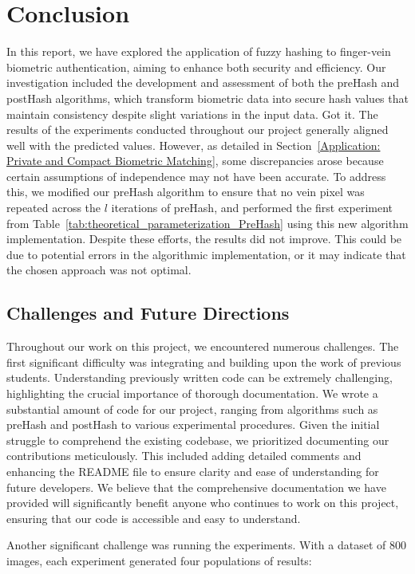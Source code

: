 \newpage

\section{Conclusion}
In this report, we have explored the application of fuzzy hashing to finger-vein biometric authentication, aiming to enhance both security and efficiency. Our investigation included the development and assessment of both the preHash and postHash algorithms, which transform biometric data into secure hash values that maintain consistency despite slight variations in the input data. Got it. The results of the experiments conducted throughout our project generally aligned well with the predicted values. However, as detailed in Section~\ref{Application: Private and Compact Biometric Matching}, some discrepancies arose because certain assumptions of independence may not have been accurate. To address this, we modified our preHash algorithm to ensure that no vein pixel was repeated across the \(l\) iterations of preHash, and performed the first experiment from Table~\ref{tab:theoretical_parameterization_PreHash} using this new algorithm implementation. Despite these efforts, the results did not improve. This could be due to potential errors in the algorithmic implementation, or it may indicate that the chosen approach was not optimal.


\subsection{Challenges and Future Directions}
Throughout our work on this project, we encountered numerous challenges. The first significant difficulty was integrating and building upon the work of previous students. Understanding previously written code can be extremely challenging, highlighting the crucial importance of thorough documentation. We wrote a substantial amount of code for our project, ranging from algorithms such as preHash and postHash to various experimental procedures. Given the initial struggle to comprehend the existing codebase, we prioritized documenting our contributions meticulously. This included adding detailed comments and enhancing the README file to ensure clarity and ease of understanding for future developers. We believe that the comprehensive documentation we have provided will significantly benefit anyone who continues to work on this project, ensuring that our code is accessible and easy to understand.

Another significant challenge was running the experiments. With a dataset of 800 images, each experiment generated four populations of results:

